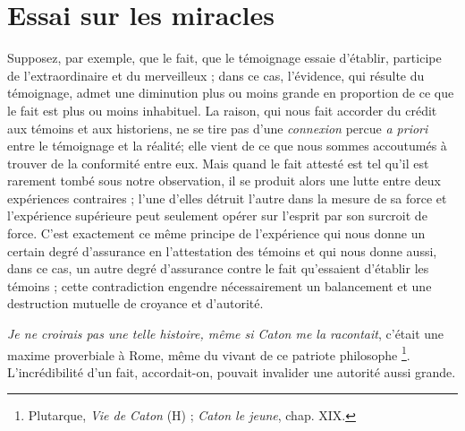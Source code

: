 
\section{Essai sur les miracles}

Supposez, par exemple, que le fait, que le témoignage
essaie d’établir, participe de l’extraordinaire et du
merveilleux ; dans ce cas, l’évidence, qui résulte du
témoignage, admet une diminution plus ou moins grande en
proportion de ce que le fait est plus ou moins inhabituel.
La raison, qui nous fait accorder du crédit aux témoins
et aux historiens, ne se tire pas d’une {\it connexion} percue
{\it a priori} entre le témoignage et la réalité; elle vient de
ce que nous sommes accoutumés à trouver de la conformité
entre eux. Mais quand le fait attesté est tel qu’il est
rarement tombé sous notre observation, il se produit
alors une lutte entre deux expériences contraires ; l'une
d'elles détruit l’autre dans la mesure de sa force et
l’expérience supérieure peut seulement opérer sur l’esprit par
son surcroit de force. C’est exactement ce même principe
de l’expérience qui nous donne un certain degré d’assurance
en l’attestation des témoins et qui nous donne aussi,
dans ce cas, un autre degré d’assurance contre le fait
qu’essaient d’établir les témoins ; cette contradiction
engendre nécessairement un balancement et une destruction
mutuelle de croyance et d’autorité.

{\it Je ne croirais pas une telle histoire, même si Caton me
la racontait}, c’était une maxime proverbiale à Rome, même
du vivant de ce patriote philosophe \footnote{Plutarque, {\it Vie de Caton} (H) ; {\it Caton le jeune}, chap. XIX.}. L’incrédibilité
d’un fait, accordait-on, pouvait invalider une autorité
aussi grande.

